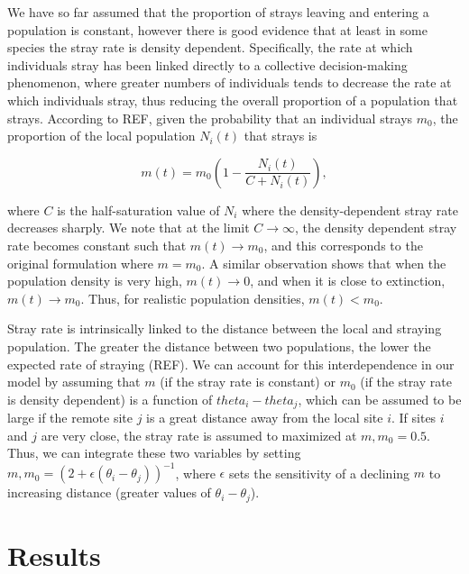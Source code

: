 \documentclass[twocolumn,preprintnumbers,amsmath,amssymb,superscriptaddress]{revtex4}
\begin{document}
We have so far assumed that the proportion of strays leaving and entering a population is constant, however there is good evidence that at least in some species the stray rate is density dependent.
Specifically, the rate at which individuals stray has been linked directly to a collective decision-making phenomenon, where greater numbers of individuals tends to decrease the rate at which individuals stray, thus reducing the overall proportion of a population that strays.
According to REF, given the probability that an individual strays $m_0$, the proportion of the local population $N_i(t)$ that strays is

\begin{equation}
  m(t) = m_0\left(1- \frac{N_i(t)}{C+N_i(t)}\right),
  \label{eq:ddm}
\end{equation}

\noindent where $C$ is the half-saturation value of $N_i$ where the density-dependent stray rate decreases sharply.
We note that at the limit $C\rightarrow \infty$, the density dependent stray rate becomes constant such that $m(t) \rightarrow m_0$, and this corresponds to the original formulation where $m=m_0$.
A similar observation shows that when the population density is very high, $m(t) \rightarrow 0$, and when it is close to extinction, $m(t) \rightarrow m_0$.
Thus, for realistic population densities, $m(t) < m_0$.


Stray rate is intrinsically linked to the distance between the local and straying population.
The greater the distance between two populations, the lower the expected rate of straying (REF).
We can account for this interdependence in our model by assuming that $m$ (if the stray rate is constant) or $m_0$ (if the stray rate is density dependent) is a function of $theta_i-theta_j$, which can be assumed to be large if the remote site $j$ is a great distance away from the local site $i$.
If sites $i$ and $j$ are very close, the stray rate is assumed to maximized at $m,m_0 = 0.5$.
Thus, we can integrate these two variables by setting $m,m_0 = (2 + \epsilon (\theta_i-\theta_j))^{-1}$, where $\epsilon$ sets the sensitivity of a declining $m$ to increasing distance (greater values of $\theta_i-\theta_j$).



\section*{Results}
\end{document}
